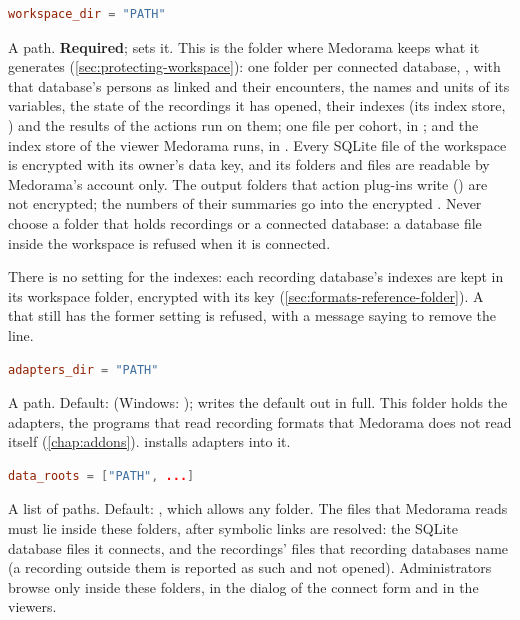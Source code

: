 \begin{lstlisting}[style=signature,language=TOML]
workspace_dir = "PATH"
\end{lstlisting}
A path. \textbf{Required};  sets it. This is the folder where Medorama
keeps what it generates (\cref{sec:protecting-workspace}): one folder per connected database,
, with that database's persons as linked and their encounters, the names and
units of its variables, the state of the recordings it has opened, their indexes (its index store, ) and the results of the actions
run on them; one file per cohort, in ; and the index store of the viewer Medorama
runs, in . Every SQLite file of the workspace is encrypted with its owner's data key, and
its folders and files are readable by Medorama's account only. The output folders that action
plug-ins write () are not encrypted; the numbers of
their summaries go into the encrypted . Never choose a folder that holds
recordings or a connected database: a database file inside the workspace is refused when it is
connected.

There is no setting for the indexes: each recording database's indexes are kept in its workspace
folder, encrypted with its key (\cref{sec:formats-reference-folder}). A  that
still has the former setting  is refused, with a message saying to remove the
line.

\begin{lstlisting}[style=signature,language=TOML]
adapters_dir = "PATH"
\end{lstlisting}
A path. Default:  (Windows:
);  writes the
default out in full. This folder holds the adapters, the programs that read recording formats
that Medorama does not read itself (\cref{chap:addons}).  installs
adapters into it.

\begin{lstlisting}[style=signature,language=TOML]
data_roots = ["PATH", ...]
\end{lstlisting}
A list of paths. Default: \code{[]}, which allows any folder. The files that Medorama reads must
lie inside these folders, after symbolic links are resolved: the SQLite database files it
connects, and the recordings' files that recording databases name (a recording outside them is
reported as such and not opened). Administrators browse only inside these folders, in the
 dialog of the connect form and in the viewers.

